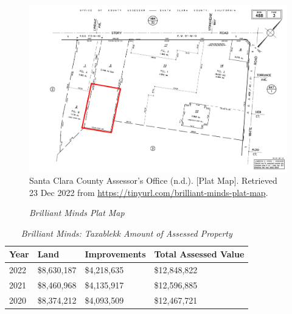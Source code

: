 \begin{figure}[t]
  \centering
  \caption[Brilliant Minds Plat Map]{\textit{Brilliant Minds Plat Map}}\label{fig:brilliant-minds-plat-map}
  \includegraphics[width=\textwidth]{Assessor-Info/brilliant-minds-plat-map-488-03}\\ %
  \footnotesize{Santa Clara County Assessor's Office (n.d.). [Plat Map]. Retrieved 23 Dec 2022 from  \url{https://tinyurl.com/brilliant-minds-plat-map}}.
\end{figure}

\begin{table}[hbtp]
\SingleSpacing%
  \caption[Brilliant Minds: Taxable Amount of Assessed Propery]{\textit{Brilliant Minds: Taxablekk Amount of Assessed Property}}\label{tab:brilliant-minds-taxable-amount}
  \begin{tabular}{llll}
    \toprule
   Year  & Land        & Improvements & Total Assessed Value \\
    \midrule
    2022 & \$8,630,187 & \$4,218,635  & \$12,848,822 \\
    2021 & \$8,460,968 & \$4,135,917  & \$12,596,885 \\
    2020 & \$8,374,212 & \$4,093,509  & \$12,467,721 \\
    \bottomrule
  \end{tabular}
\end{table}

